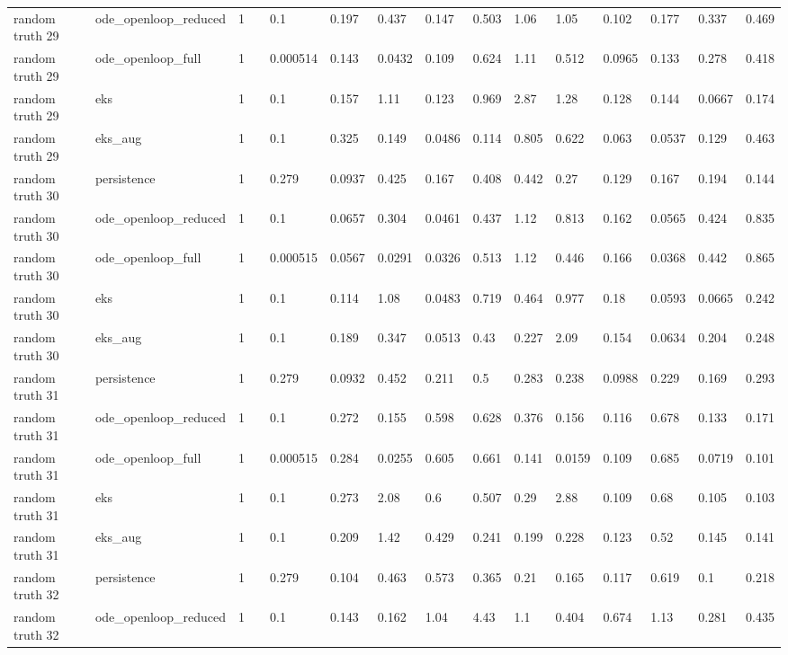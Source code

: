\begin{table}[t]
\begin{tabular}{lllllllllllllll}
random truth 29 & ode\_openloop\_reduced & 1 &  & 0.1 & 0.197 & 0.437 & 0.147 & 0.503 & 1.06 & 1.05 & 0.102 & 0.177 & 0.337 & 0.469 \\
random truth 29 & ode\_openloop\_full & 1 &  & 0.000514 & 0.143 & 0.0432 & 0.109 & 0.624 & 1.11 & 0.512 & 0.0965 & 0.133 & 0.278 & 0.418 \\
random truth 29 & eks & 1 &  & 0.1 & 0.157 & 1.11 & 0.123 & 0.969 & 2.87 & 1.28 & 0.128 & 0.144 & 0.0667 & 0.174 \\
random truth 29 & eks\_aug & 1 &  & 0.1 & 0.325 & 0.149 & 0.0486 & 0.114 & 0.805 & 0.622 & 0.063 & 0.0537 & 0.129 & 0.463 \\
random truth 30 & persistence & 1 &  & 0.279 & 0.0937 & 0.425 & 0.167 & 0.408 & 0.442 & 0.27 & 0.129 & 0.167 & 0.194 & 0.144 \\
random truth 30 & ode\_openloop\_reduced & 1 &  & 0.1 & 0.0657 & 0.304 & 0.0461 & 0.437 & 1.12 & 0.813 & 0.162 & 0.0565 & 0.424 & 0.835 \\
random truth 30 & ode\_openloop\_full & 1 &  & 0.000515 & 0.0567 & 0.0291 & 0.0326 & 0.513 & 1.12 & 0.446 & 0.166 & 0.0368 & 0.442 & 0.865 \\
random truth 30 & eks & 1 &  & 0.1 & 0.114 & 1.08 & 0.0483 & 0.719 & 0.464 & 0.977 & 0.18 & 0.0593 & 0.0665 & 0.242 \\
random truth 30 & eks\_aug & 1 &  & 0.1 & 0.189 & 0.347 & 0.0513 & 0.43 & 0.227 & 2.09 & 0.154 & 0.0634 & 0.204 & 0.248 \\
random truth 31 & persistence & 1 &  & 0.279 & 0.0932 & 0.452 & 0.211 & 0.5 & 0.283 & 0.238 & 0.0988 & 0.229 & 0.169 & 0.293 \\
random truth 31 & ode\_openloop\_reduced & 1 &  & 0.1 & 0.272 & 0.155 & 0.598 & 0.628 & 0.376 & 0.156 & 0.116 & 0.678 & 0.133 & 0.171 \\
random truth 31 & ode\_openloop\_full & 1 &  & 0.000515 & 0.284 & 0.0255 & 0.605 & 0.661 & 0.141 & 0.0159 & 0.109 & 0.685 & 0.0719 & 0.101 \\
random truth 31 & eks & 1 &  & 0.1 & 0.273 & 2.08 & 0.6 & 0.507 & 0.29 & 2.88 & 0.109 & 0.68 & 0.105 & 0.103 \\
random truth 31 & eks\_aug & 1 &  & 0.1 & 0.209 & 1.42 & 0.429 & 0.241 & 0.199 & 0.228 & 0.123 & 0.52 & 0.145 & 0.141 \\
random truth 32 & persistence & 1 &  & 0.279 & 0.104 & 0.463 & 0.573 & 0.365 & 0.21 & 0.165 & 0.117 & 0.619 & 0.1 & 0.218 \\
random truth 32 & ode\_openloop\_reduced & 1 &  & 0.1 & 0.143 & 0.162 & 1.04 & 4.43 & 1.1 & 0.404 & 0.674 & 1.13 & 0.281 & 0.435 \\

\end{tabular}
\end{table}

